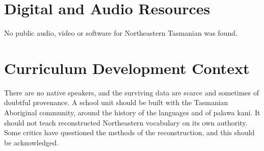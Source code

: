\documentclass[12pt]{article}
\begin{document}
\section{Digital and Audio Resources}
No public audio, video or software for Northeastern Tasmanian was found.

\section{Curriculum Development Context}
There are no native speakers, and the surviving data are scarce and sometimes of doubtful provenance. A school unit should be built with the Tasmanian Aboriginal community, around the history of the languages and of palawa kani. It should not teach reconstructed Northeastern vocabulary on its own authority. Some critics have questioned the methods of the reconstruction, and this should be acknowledged.
\end{document}
